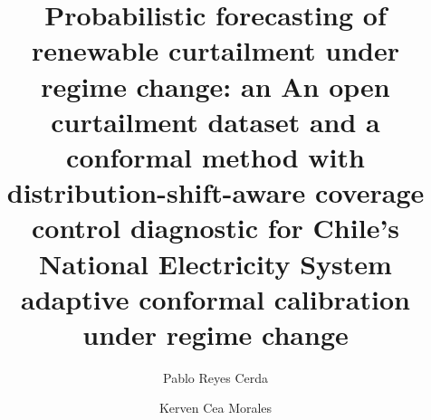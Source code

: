 \documentclass[preprint,3p,times]{elsarticle}
\providecommand{\DIFaddtex}[1]{{\protect\color{blue} \sf #1}} %
\providecommand{\DIFdeltex}[1]{{\protect\color{red} \scriptsize #1}} %
\providecommand{\DIFaddbegin}{} %
\providecommand{\DIFaddend}{} %
\providecommand{\DIFdelbegin}{} %
\providecommand{\DIFdelend}{} %
\providecommand{\DIFadd}[1]{\texorpdfstring{\DIFaddtex{#1}}{#1}} %
\providecommand{\DIFdel}[1]{\texorpdfstring{\DIFdeltex{#1}}{}} %
\begin{document}
\begin{frontmatter}

\title{\DIFdelbegin \DIFdel{Probabilistic forecasting of renewable curtailment under regime change: an }\DIFdelend \DIFaddbegin \DIFadd{An }\DIFaddend open \DIFaddbegin \DIFadd{curtailment }\DIFaddend dataset and a \DIFdelbegin \DIFdel{conformal method with distribution-shift-aware coverage control }\DIFdelend \DIFaddbegin \DIFadd{diagnostic }\DIFaddend for \DIFdelbegin \DIFdel{Chile's National Electricity System}\DIFdelend \DIFaddbegin \DIFadd{adaptive conformal calibration under regime change}\DIFaddend }

\author[usach]{Pablo Reyes Cerda}
\author[ubb]{Kerven Cea Morales}


\address[usach]{Mag\'ister en Gesti\'on de la Innovaci\'on y el Emprendimiento Tecnol\'ogico, Universidad de Santiago de Chile, Santiago, Chile}
\address[ubb]{Programa de Doctorado en Matem\'atica Aplicada, Universidad del B\'io-B\'io, Concepci\'on, Chile}


\end{frontmatter}
\end{document}
